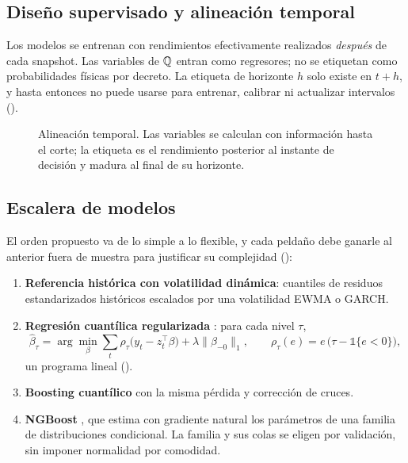 \subsection{Diseño supervisado y alineación temporal}\label{sec:alineacion}

Los modelos se entrenan con rendimientos efectivamente realizados \emph{después} de cada snapshot. Las
variables de $\mathbb{Q}$ entran como regresores; no se etiquetan como probabilidades físicas por decreto. La
etiqueta de horizonte $h$ solo existe en $t+h$, y hasta entonces no puede usarse para entrenar, calibrar ni
actualizar intervalos ().

\begin{figure}[H]
\centering
\resizebox{\linewidth}{!}{}
\caption{Alineación temporal. Las variables se calculan con información hasta el corte; la etiqueta es el
rendimiento posterior al instante de decisión y madura al final de su horizonte.}
\label{fig:alineacion}
\end{figure}

\subsection{Escalera de modelos}\label{sec:escalera}

El orden propuesto va de lo simple a lo flexible, y cada peldaño debe ganarle al anterior fuera de muestra
para justificar su complejidad ():

\begin{enumerate}
\item \textbf{Referencia histórica con volatilidad dinámica}: cuantiles de residuos estandarizados
históricos escalados por una volatilidad EWMA o GARCH.
\item \textbf{Regresión cuantílica regularizada} \citep{koenker1978}: para cada nivel $\tau$,
\begin{equation}
\hat\beta_\tau=\arg\min_\beta\sum_t\rho_\tau\bigl(y_t-z_t^\top\beta\bigr)+\lambda\lVert\beta_{-0}\rVert_1,
\qquad \rho_\tau(e)=e\,\bigl(\tau-\mathbb 1\{e<0\}\bigr),
\label{eq:qr}
\end{equation}
un programa lineal ().
\item \textbf{Boosting cuantílico} con la misma pérdida y corrección de cruces.
\item \textbf{NGBoost} \citep{duan2020}, que estima con gradiente natural los parámetros de una familia de
distribuciones condicional. La familia y sus colas se eligen por validación, sin imponer normalidad por
comodidad.
\end{enumerate}

